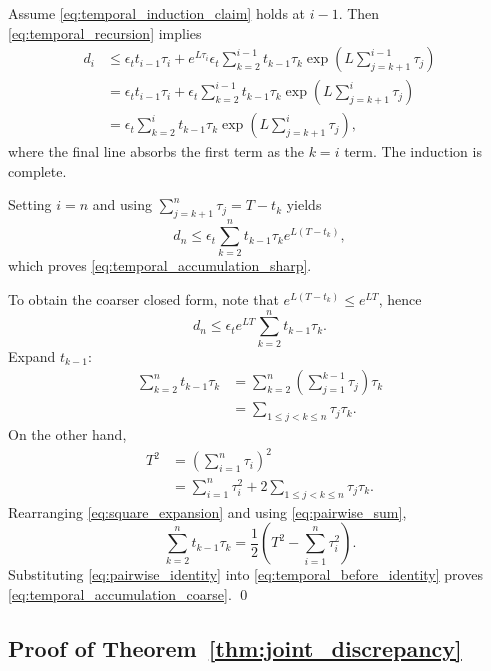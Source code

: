 \documentclass{article}
\theoremstyle{plain}
\theoremstyle{definition}
\theoremstyle{remark}
\begin{document}
Assume \cref{eq:temporal_induction_claim} holds at $i-1$. Then \cref{eq:temporal_recursion} implies
\begin{align}
d_i
&\le
\epsilon_t t_{i-1}\tau_i
+e^{L\tau_i}
\epsilon_t
\sum_{k=2}^{i-1}
 t_{k-1}\tau_k
\exp\!\left(
L\sum_{j=k+1}^{i-1}\tau_j
\right)
\nonumber\\
&=
\epsilon_t t_{i-1}\tau_i
+
\epsilon_t
\sum_{k=2}^{i-1}
 t_{k-1}\tau_k
\exp\!\left(
L\sum_{j=k+1}^{i}\tau_j
\right)
\nonumber\\
&=
\epsilon_t
\sum_{k=2}^{i}
 t_{k-1}\tau_k
\exp\!\left(
L\sum_{j=k+1}^{i}\tau_j
\right),
\end{align}
where the final line absorbs the first term as the $k=i$ term. The induction is complete.

Setting $i=n$ and using $\sum_{j=k+1}^{n}\tau_j=T-t_k$ yields
\begin{equation}
d_n
\le
\epsilon_t
\sum_{k=2}^{n}
 t_{k-1}\tau_k e^{L(T-t_k)},
\end{equation}
which proves \cref{eq:temporal_accumulation_sharp}.

To obtain the coarser closed form, note that $e^{L(T-t_k)}\le e^{LT}$, hence
\begin{equation}
d_n
\le
\epsilon_t e^{LT}
\sum_{k=2}^{n}t_{k-1}\tau_k.
\label{eq:temporal_before_identity}
\end{equation}
Expand $t_{k-1}$:
\begin{align}
\sum_{k=2}^{n}t_{k-1}\tau_k
&=
\sum_{k=2}^{n}
\left(\sum_{j=1}^{k-1}\tau_j\right)\tau_k
\nonumber\\
&=
\sum_{1\le j<k\le n}\tau_j\tau_k.
\label{eq:pairwise_sum}
\end{align}
On the other hand,
\begin{align}
T^2
&=\left(\sum_{i=1}^{n}\tau_i\right)^2
\nonumber\\
&=\sum_{i=1}^{n}\tau_i^2
+2\sum_{1\le j<k\le n}\tau_j\tau_k.
\label{eq:square_expansion}
\end{align}
Rearranging \cref{eq:square_expansion} and using \cref{eq:pairwise_sum},
\begin{equation}
\sum_{k=2}^{n}t_{k-1}\tau_k
=\frac{1}{2}
\left(T^2-\sum_{i=1}^{n}\tau_i^2\right).
\label{eq:pairwise_identity}
\end{equation}
Substituting \cref{eq:pairwise_identity} into \cref{eq:temporal_before_identity} proves \cref{eq:temporal_accumulation_coarse}. \qed

\subsection{Proof of Theorem~\ref{thm:joint_discrepancy}}
\label{app:proof_joint}
\end{document}
